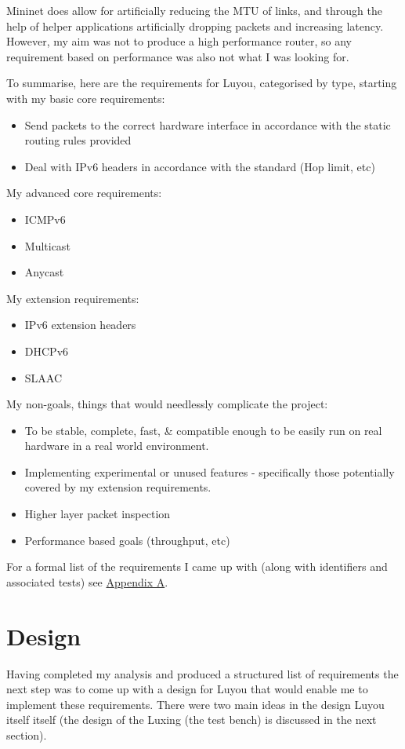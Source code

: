 \documentclass[12pt,a4paper,twoside,openright]{report}
\begin{document}
Mininet does allow for artificially reducing the MTU of links, and through the help of helper applications artificially dropping packets and increasing latency.  However, my aim was not to produce a high performance router, so any requirement based on performance was also not what I was looking for.

\bigskip

To summarise, here are the requirements for Luyou, categorised by type, starting with my basic core requirements:
\begin{itemize}
\item Send packets to the correct hardware interface in accordance with the static routing rules provided
\item Deal with IPv6 headers in accordance with the standard (Hop limit, etc)
\end{itemize}
My advanced core requirements:
\begin{itemize}
\item ICMPv6
\item Multicast
\item Anycast
\end{itemize}
My extension requirements:
\begin{itemize}
\item IPv6 extension headers
\item DHCPv6
\item SLAAC
\end{itemize}
My non-goals, things that would needlessly complicate the project:
\begin{itemize}
\item To be stable, complete, fast, \& compatible enough to be easily run on real hardware in a real world environment.
\item Implementing experimental or unused features - specifically those potentially covered by my extension requirements.
\item Higher layer packet inspection
\item Performance based goals (throughput, etc)
\end{itemize}
For a formal list of the requirements I came up with (along with identifiers and associated tests) see \hyperref[appendix::requirements]{Appendix A}.

\section{Design}
\label{sec::design}

Having completed my analysis and produced a structured list of requirements the next step was to come up with a design for Luyou that would enable me to implement these requirements.  There were two main ideas in the design Luyou itself itself (the design of the Luxing (the test bench) is discussed in the next section). 
\end{document}

